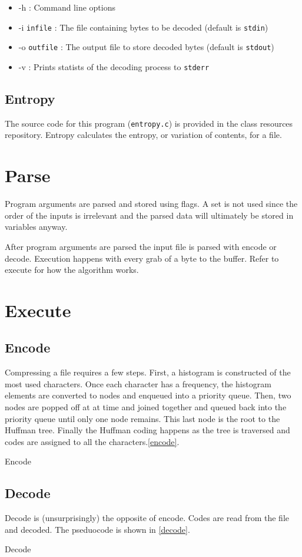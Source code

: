 \documentclass[12pt]{article}
\def\code#1{\texttt{#1}} %
\begin{document}
\begin{itemize}
    \item{-h : Command line options }
	\item{-i \code{infile} : The file containing bytes to be decoded (default is \code{stdin})}
		\item{-o \code{outfile} : The output file to store decoded bytes (default is \code{stdout})}
	\item{-v : Prints statists of the decoding process to \code{stderr}}
\end{itemize}

\subsection{Entropy}

The source code for this program (\code{entropy.c}) is provided in the class resources repository.
Entropy calculates the entropy, or variation of contents, for a file.

\section{Parse}

Program arguments are parsed and stored using flags.
A set is not used since the order of the inputs is irrelevant and the parsed data
will ultimately be stored in variables anyway.

After program arguments are parsed the input file is parsed with encode or decode.
Execution happens with every grab of a byte to the buffer.
Refer to execute for how the algorithm works.

\section{Execute}

\subsection{Encode}

Compressing a file requires a few steps. First, a histogram is constructed of the
most used characters. Once each character has a frequency, the histogram elements
are converted to nodes and enqueued into a priority queue. Then, two nodes are 
popped off at at time and joined together and queued back into the priority
queue until only one node remains. This last node is the root to the Huffman
tree. Finally the Huffman coding happens as the tree is traversed and codes
are assigned to all the characters.\vref{encode}.

\begin{algorithm}
    \caption{Encode}\label{encode}
\end{algorithm}

\subsection{Decode}

Decode is (unsurprisingly) the opposite of encode. Codes are read from the file
and decoded.
The pseduocode is shown in \vref{decode}.

\begin{algorithm}
    \caption{Decode}\label{decode}
\end{algorithm}
\end{document}
